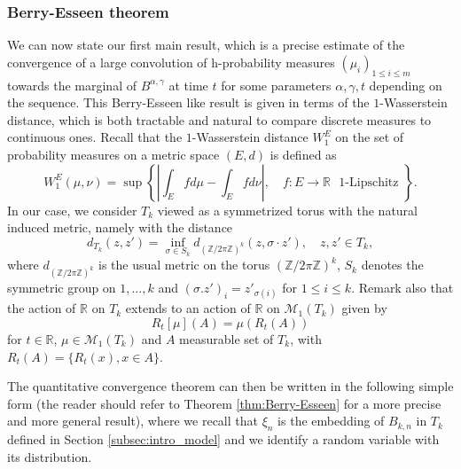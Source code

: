 \documentclass[10pt,11pt]{amsart}%
\begin{document}
\subsubsection{Berry-Esseen theorem} We can now state our first main result, which is a precise estimate of the convergence of a large convolution of h-probability measures $(\mu_i)_{1\leq i\leq m}$ towards the marginal of $B^{\alpha,\gamma}$ at time $t$ for some parameters $\alpha,\gamma,t$ depending on the sequence. This Berry-Esseen like result is given in terms of the $1$-Wasserstein distance, which is both tractable and natural to compare discrete measures to continuous ones. Recall that the $1$-Wasserstein distance $W_1^E$ on the set of probability measures on a metric space $(E,d)$ is defined as 
$$W_1^{E}(\mu,\nu)=\sup\left\{\left\vert \int_E fd\mu-\int_E fd\nu\right\vert,\quad f:E\rightarrow \mathbb{R}\text{ $1$-Lipschitz }\right\}.$$
In our case, we consider $T_k$ viewed as a symmetrized torus with the natural induced metric, namely with the distance 
$$d_{ T_{k}}(z,z')=\inf_{\sigma\in S_k}d_{(\mathbb{Z}/2\pi\mathbb{Z})^k}(z,\sigma\cdot z'),\quad z,z'\in T_{k},$$
where $d_{(\mathbb{Z}/2\pi\mathbb{Z})^k}$ is the usual metric on the torus $(\mathbb{Z}/2\pi\mathbb{Z})^k$, $S_k$ denotes the symmetric group on ${1,\ldots,k}$ and $(\sigma.z')_i=z'_{\sigma(i)}$ for $1\leq i\leq k$. Remark also that the action of $\mathbb{R}$ on $T_k$ extends to an action of $\mathbb{R}$ on $\mathcal{M}_1( T_{k})$ given by 
$$R_t[\mu](A)=\mu(R_t( A))$$
for $t\in\mathbb{R}$, $\mu\in \mathcal{M}_1(T_k)$ and $A$ measurable set of $T_k$, with $R_t(A)=\{R_t(x), x\in A\}$. 

The quantitative convergence theorem can then be written in the following simple form (the reader should refer to Theorem \ref{thm:Berry-Esseen} for a more precise and more general result), where we recall that $\xi_n$ is the embedding of $B_{k,n}$ in $T_{k}$ defined in Section \ref{subsec:intro_model} and we identify a random variable with its distribution.
\end{document}
